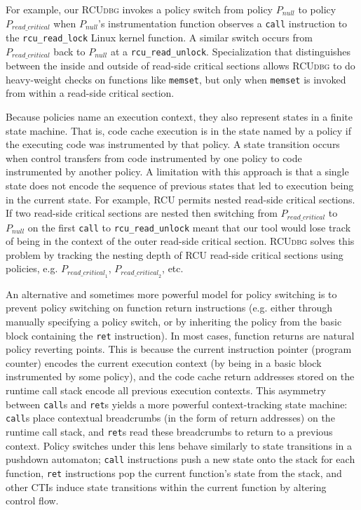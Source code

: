 \documentclass[preprint]{sigplanconf}
\newcommand{\toolname}[1]{{\scshape #1}}
\begin{document}
For example, our \toolname{RCUdbg} invokes a policy switch from policy $P_{\mathit{null}}$ to policy $P_{\mathit{read\_critical}}$ when $P_{\mathit{null}}$'s instrumentation function observes a \texttt{call} instruction to the \texttt{rcu\_read\_lock} Linux kernel function. A similar switch occurs from $P_{\mathit{read\_critical}}$ back to $P_{\mathit{null}}$ at a \texttt{rcu\_read\_unlock}. Specialization that distinguishes between the inside and outside of read-side critical sections allows \toolname{RCUdbg} to do heavy-weight checks on functions like \texttt{memset}, but only when \texttt{memset} is invoked from within a read-side critical section.

Because policies name an execution context, they also represent states in a finite state machine. That is, code cache execution is in the state named by a policy if the  executing code was instrumented by that policy. A state transition occurs when control transfers from code instrumented by one policy to code instrumented by another policy. A limitation with this approach is that a single state does not encode the sequence of previous states that led to execution being in the current state. For example, RCU permits nested read-side critical sections. If two read-side critical sections are nested then switching from $P_{\mathit{read\_critical}}$ to $P_{\mathit{null}}$ on the first \texttt{call} to \texttt{rcu\_read\_unlock} meant that our tool would lose track of being in the context of the outer read-side critical section.  \toolname{RCUdbg} solves this problem by tracking the nesting depth of RCU read-side critical sections using policies, e.g. $P_{\mathit{read\_critical}_1}$, $P_{\mathit{read\_critical}_2}$, etc.

An alternative and sometimes more powerful model for policy switching is to prevent policy switching on function return instructions (e.g. either through manually specifying a policy switch, or by inheriting the policy from the basic block containing the \texttt{ret} instruction). In most cases, function returns are natural policy reverting points. This is because the current instruction pointer (program counter) encodes the current execution context (by being in a basic block instrumented by some policy), and the code cache return addresses stored on the runtime call stack encode all previous execution contexts. This asymmetry between \texttt{call}s and \texttt{ret}s yields a more powerful context-tracking state machine: \texttt{call}s place contextual breadcrumbs (in the form of return addresses) on the runtime call stack, and \texttt{ret}s read these breadcrumbs to return to a previous context. Policy switches under this lens behave similarly to state transitions in a pushdown automaton; \texttt{call} instructions push a new state onto the stack for each function, \texttt{ret} instructions pop the current function's state from the stack, and other CTIs induce state transitions within the current function by altering control flow.
\end{document}
